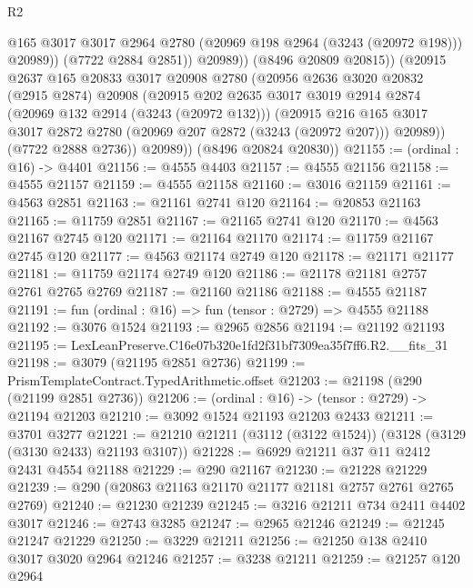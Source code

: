 \begin{lexlean}{R2}
\begin{coremodule}
                    @165
                    @3017
                    @3017
                    @2964
                    @2780
                    (@20969 @198 @2964 (@3243 (@20972 @198)))
                    @20989))
                (@7722 @2884 @2851))
              @20989))
          (@8496 @20809 @20815))
        (@20915
          @2637
          @165
          @20833
          @3017
          @20908
          @2780
          (@20956
            @2636
            @3020
            @20832
            (@2915 @2874)
            @20908
            (@20915
              @202
              @2635
              @3017
              @3019
              @2914
              @2874
              (@20969 @132 @2914 (@3243 (@20972 @132)))
              (@20915
                @216
                @165
                @3017
                @3017
                @2872
                @2780
                (@20969 @207 @2872 (@3243 (@20972 @207)))
                @20989))
            (@7722 @2888 @2736))
          @20989))
      (@8496 @20824 @20830))
@21155 := (ordinal : @16) -> @4401
@21156 := @4555 @4403
@21157 := @4555 @21156
@21158 := @4555 @21157
@21159 := @4555 @21158
@21160 := @3016 @21159
@21161 := @4563 @2851
@21163 := @21161 @2741 @120
@21164 := @20853 @21163
@21165 := @11759 @2851
@21167 := @21165 @2741 @120
@21170 := @4563 @21167 @2745 @120
@21171 := @21164 @21170
@21174 := @11759 @21167 @2745 @120
@21177 := @4563 @21174 @2749 @120
@21178 := @21171 @21177
@21181 := @11759 @21174 @2749 @120
@21186 := @21178 @21181 @2757 @2761 @2765 @2769
@21187 := @21160 @21186
@21188 := @4555 @21187
@21191 := fun (ordinal : @16) => fun (tensor : @2729) => @4555 @21188
@21192 := @3076 @1524
@21193 := @2965 @2856
@21194 := @21192 @21193
@21195 := LexLeanPreserve.C16e07b320e1fd2f31bf7309ea35f7ff6.R2.__fits_31
@21198 := @3079 (@21195 @2851 @2736)
@21199 := PrismTemplateContract.TypedArithmetic.offset
@21203 := @21198 (@290 (@21199 @2851 @2736))
@21206 := (ordinal : @16) -> (tensor : @2729) -> @21194 @21203
@21210 := @3092 @1524 @21193 @21203 @2433
@21211 := @3701 @3277
@21221 := @21210 @21211 (@3112 (@3122 @1524)) (@3128 (@3129 (@3130 @2433) @21193 @3107))
@21228 := @6929 @21211 @37 @11 @2412 @2431 @4554 @21188
@21229 := @290 @21167
@21230 := @21228 @21229
@21239 := @290 (@20863 @21163 @21170 @21177 @21181 @2757 @2761 @2765 @2769)
@21240 := @21230 @21239
@21245 := @3216 @21211 @734 @2411 @4402 @3017
@21246 := @2743 @3285
@21247 := @2965 @21246
@21249 := @21245 @21247 @21229
@21250 := @3229 @21211
@21256 := @21250 @138 @2410 @3017 @3020 @2964 @21246
@21257 := @3238 @21211
@21259 := @21257 @120 @2964

\end{coremodule}
\end{lexlean}
